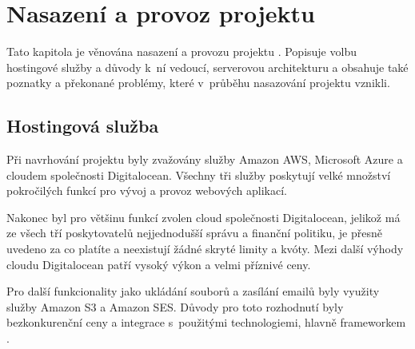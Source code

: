 \section{Nasazení a provoz projektu}
\label{sec:deployment-running}

Tato kapitola je věnována nasazení a provozu projektu \bso. Popisuje volbu hostingové služby a důvody k~ní vedoucí, serverovou architekturu a obsahuje také poznatky a překonané problémy, které v~průběhu nasazování projektu vznikli.

\subsection{Hostingová služba}
\label{sub:hosting}

Při navrhování projektu \bso byly zvažovány služby Amazon AWS\cite{amazon-aws}, Microsoft Azure\cite{ms-azure} a cloudem společnosti Digitalocean\cite{digitalocean}. Všechny tři služby poskytují velké množství pokročilých funkcí pro vývoj a provoz webových aplikací. 

Nakonec byl pro většinu funkcí zvolen cloud společnosti Digitalocean, jelikož má ze všech tří poskytovatelů nejjednodušší správu a finanční politiku, je přesně uvedeno za co platíte a neexistují žádné skryté limity a kvóty. Mezi další výhody cloudu Digitalocean patří vysoký výkon a velmi příznivé ceny.\cite{digitalocean-advantages}

Pro další funkcionality jako ukládání souborů a zasílání emailů byly využity služby Amazon S3\cite{amazon-s3} a Amazon SES\cite{amazon-ses}. Důvody pro toto rozhodnutí byly bezkonkurenční ceny a integrace s~použitými technologiemi, hlavně \gls{framework}em .


